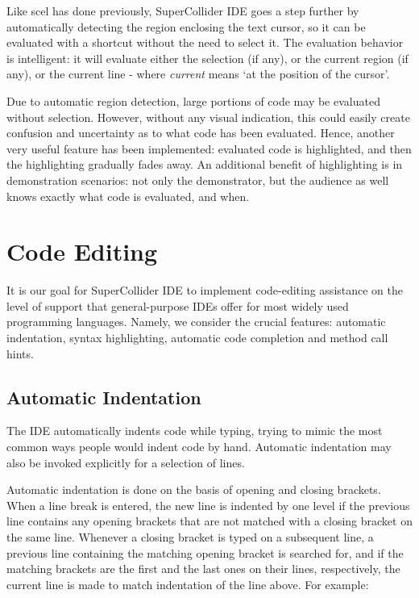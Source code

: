 \documentclass[11pt,a4paper]{article}
\begin{document}
Like scel has done previously, SuperCollider IDE goes a step further by automatically detecting the region enclosing
the text cursor, so it can be evaluated with a shortcut without the need to select it. The evaluation behavior is
intelligent: it will evaluate either the selection (if any), or the current region (if any), or the current line - where
\emph{current} means `at the position of the cursor'.

Due to automatic region detection, large portions of code may be evaluated without selection. However, without any
visual indication, this could easily create confusion and uncertainty as to what code has been evaluated. Hence,
another very useful feature has been implemented: evaluated code is highlighted, and then the highlighting gradually
fades away. An additional benefit of highlighting is in demonstration scenarios: not only the demonstrator, but the
audience as well knows exactly what code is evaluated, and when.

\section{Code Editing}

It is our goal for SuperCollider IDE to implement code-editing assistance on the level of support
that general-purpose IDEs offer for most widely used programming languages. Namely,
we consider the crucial features: automatic indentation, syntax highlighting, automatic code completion and method call
hints.

\subsection{Automatic Indentation}
\label{auto-indentation}

The IDE automatically indents code while typing, trying to mimic the most common ways people would indent code by hand.
Automatic indentation may also be invoked explicitly for a selection of lines.

Automatic indentation is done on the basis of opening and closing brackets. When a line break is entered, the new line
is indented by one level if the previous line contains any opening brackets that are not matched with a closing bracket
on the same line. Whenever a closing bracket is typed on a subsequent line, a previous line containing the matching
opening bracket is searched for, and if the matching brackets are the first and the last ones on their lines,
respectively, the current line is made to match indentation of the line above. For example:
\end{document}

